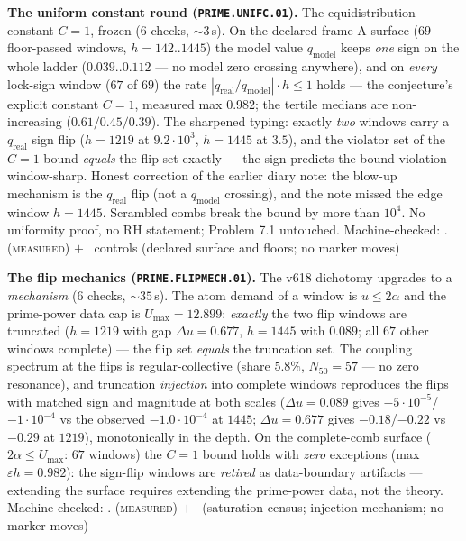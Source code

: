 \par\smallskip\noindent\textbf{The uniform constant round
(\texttt{PRIME.UNIFC.01}).}
The equidistribution constant $C=1$, frozen ($6$ checks,
${\sim}3$\,s).  On the declared frame-A surface ($69$ floor-passed
windows, $h=142..1445$) the model value $q_{\mathrm{model}}$ keeps
\emph{one} sign on the whole ladder ($0.039..0.112$ --- no model zero
crossing anywhere), and on \emph{every} lock-sign window ($67$ of
$69$) the rate $|q_{\mathrm{real}}/q_{\mathrm{model}}|\cdot h\le1$
holds --- the conjecture's explicit constant $C=1$, measured max
$0.982$; the tertile medians are non-increasing
($0.61/0.45/0.39$).  The sharpened typing: exactly \emph{two} windows
carry a $q_{\mathrm{real}}$ sign flip ($h=1219$ at $9.2\cdot10^3$,
$h=1445$ at $3.5$), and the violator set of the $C=1$ bound
\emph{equals} the flip set exactly --- the sign predicts the bound
violation window-sharp.  Honest correction of the earlier diary note:
the blow-up mechanism is the $q_{\mathrm{real}}$ flip (not a
$q_{\mathrm{model}}$ crossing), and the note missed the edge window
$h=1445$.  Scrambled combs break the bound by more than $10^4$.  No
uniformity proof, no RH statement; Problem 7.1 untouched.
Machine-checked: .
(\textsc{measured}) $+$ \mE\ controls (declared surface and floors;
no marker moves)
\par\smallskip


\par\smallskip\noindent\textbf{The flip mechanics
(\texttt{PRIME.FLIPMECH.01}).}
The v618 dichotomy upgrades to a \emph{mechanism} ($6$ checks,
${\sim}35$\,s).  The atom demand of a window is $u\le2\alpha$ and the
prime-power data cap is $U_{\max}=12.899$: \emph{exactly} the two
flip windows are truncated ($h=1219$ with gap $\Delta u=0.677$,
$h=1445$ with $0.089$; all $67$ other windows complete) --- the flip
set \emph{equals} the truncation set.  The coupling spectrum at the
flips is regular-collective (share $5.8\%$, $N_{50}=57$ --- no zero
resonance), and truncation \emph{injection} into complete windows
reproduces the flips with matched sign and magnitude at both scales
($\Delta u=0.089$ gives $-5\cdot10^{-5}$/$-1\cdot10^{-4}$ vs the
observed $-1.0\cdot10^{-4}$ at $1445$; $\Delta u=0.677$ gives
$-0.18$/$-0.22$ vs $-0.29$ at $1219$), monotonically in the depth.
On the complete-comb surface ($2\alpha\le U_{\max}$: $67$ windows)
the $C=1$ bound holds with \emph{zero} exceptions (max
$\varepsilon h=0.982$): the sign-flip windows are \emph{retired} as
data-boundary artifacts --- extending the surface requires extending
the prime-power data, not the theory.
Machine-checked: .
(\textsc{measured}) $+$ \mE\ (saturation census; injection mechanism;
no marker moves)
\par\smallskip


